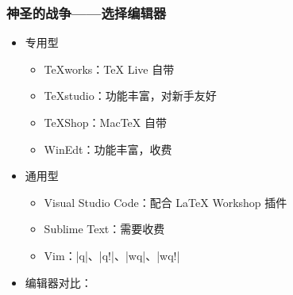 \begin{frame}[fragile]
\frametitle{神圣的战争——选择编辑器}
\begin{itemize}
  \item<+-> 专用型

    \begin{itemize}
      \item TeXworks：\TeX{} Live 自带 \faWindows{} \faApple{} \faLinux{}
      \item TeXstudio：功能丰富，对新手友好 \faWindows{} \faApple{} \faLinux{}
      \item TeXShop：Mac\TeX{} 自带 \faApple{}
      \item WinEdt：功能丰富，收费 \faWindows{}
    \end{itemize}

  \item<+-> 通用型

    \begin{itemize}
      \item Visual Studio Code：配合 LaTeX Workshop 插件
      \item Sublime Text：需要收费
      \item Vim：|q|、|q!|、|wq|、|wq!|
    \end{itemize}

  \item<+-> 编辑器对比：
\end{itemize}
\end{frame}
